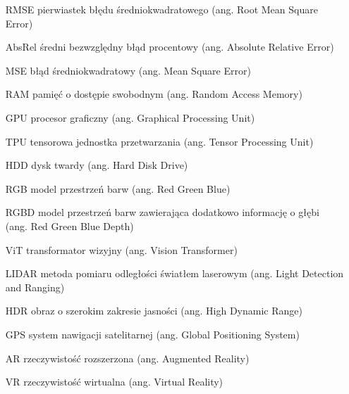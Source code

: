 \flushleft



\begin{itemize}[noitemsep,topsep=0pt,parsep=0pt,partopsep=0pt,labelwidth=3cm,align=left,itemindent=3cm]
\item[RMSE] pierwiastek błędu średniokwadratowego (ang. Root Mean Square Error)
    \item[AbsRel] średni bezwzględny błąd procentowy (ang. Absolute Relative Error)
    \item[MSE] błąd średniokwadratowy (ang. Mean Square Error)
    \item[RAM] pamięć o dostępie swobodnym (ang. Random Access Memory)
    \item[GPU] procesor graficzny (ang. Graphical Processing Unit)
    \item[TPU] tensorowa jednostka przetwarzania (ang. Tensor Processing Unit)
    \item[HDD] dysk twardy (ang. Hard Disk Drive)
    \item[RGB] model przestrzeń barw (ang. Red Green Blue)
    \item[RGBD] model przestrzeń barw zawierająca dodatkowo informację o głębi (ang. Red Green Blue Depth)
    \item[ViT] transformator wizyjny (ang. Vision Transformer)
    \item[LIDAR] metoda pomiaru odległości światłem laserowym (ang. Light Detection and Ranging)
    \item[HDR] obraz o szerokim zakresie jasności (ang. High Dynamic Range)
    \item[GPS] system nawigacji satelitarnej (ang. Global Positioning System)
    \item[AR] rzeczywistość rozszerzona (ang. Augmented Reality)
    \item[VR] rzeczywistość wirtualna (ang. Virtual Reality)
\end{itemize}

